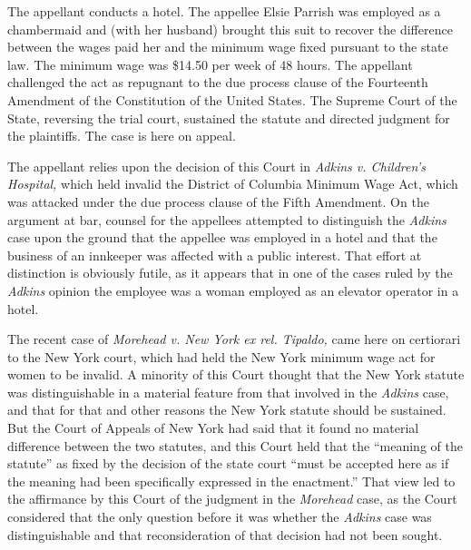 \documentclass[
  letterpaper,
  11pt,
  DIV=9,
  openright]{scrbook}
\begin{document}
The appellant conducts a hotel. The appellee Elsie Parrish was employed
as a chambermaid and (with her husband) brought this suit to recover the
difference between the wages paid her and the minimum wage fixed
pursuant to the state law. The minimum wage was \$14.50 per week of 48
hours. The appellant challenged the act as repugnant to the due process
clause of the Fourteenth Amendment of the Constitution of the United
States. The Supreme Court of the State, reversing the trial court,
sustained the statute and directed judgment for the plaintiffs. The case
is here on appeal.

The appellant relies upon the decision of this Court in \emph{Adkins v.
Children's Hospital,} which held invalid the District of Columbia
Minimum Wage Act, which was attacked under the due process clause of the
Fifth Amendment. On the argument at bar, counsel for the appellees
attempted to distinguish the \emph{Adkins} case upon the ground that the
appellee was employed in a hotel and that the business of an innkeeper
was affected with a public interest. That effort at distinction is
obviously futile, as it appears that in one of the cases ruled by the
\emph{Adkins} opinion the employee was a woman employed as an elevator
operator in a hotel.

The recent case of \emph{Morehead v. New York ex rel. Tipaldo,} came
here on certiorari to the New York court, which had held the New York
minimum wage act for women to be invalid. A minority of this Court
thought that the New York statute was distinguishable in a material
feature from that involved in the \emph{Adkins} case, and that for that
and other reasons the New York statute should be sustained. But the
Court of Appeals of New York had said that it found no material
difference between the two statutes, and this Court held that the
``meaning of the statute'' as fixed by the decision of the state court
``must be accepted here as if the meaning had been specifically
expressed in the enactment.'' That view led to the affirmance by this
Court of the judgment in the \emph{Morehead} case, as the Court
considered that the only question before it was whether the
\emph{Adkins} case was distinguishable and that reconsideration of that
decision had not been sought.
\end{document}
